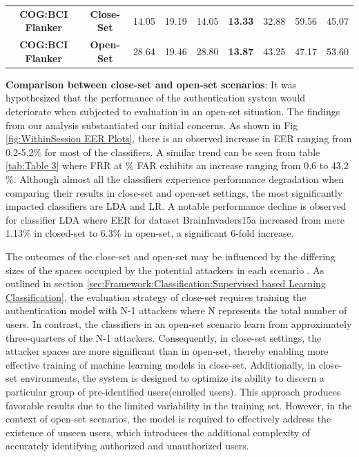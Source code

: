 \begin{table}[ht]
{\begin{tabular}{cc|ccccccc}
\rule{0pt}{25pt} \textbf{COG:BCI Flanker} & \textbf{Close-Set} & 14.05 & 19.19 & 14.05 & \textbf{13.33} & 32.88 & 59.56 & 45.07\\
\rule{0pt}{25pt} \textbf{COG:BCI Flanker} & \textbf{Open-Set}& 28.64 & 19.46 & 28.80 & \textbf{13.87} & 43.25 & 47.17 & 53.60\\
\hline
\end{tabular}
}
\end{table}

\textbf{\large Comparison between close-set and open-set scenarios}: It was hypothesized that the performance of the authentication system would deteriorate when subjected to evaluation in an open-set situation. The findings from our analysis substantiated our initial concerns. As shown in Fig \ref{fig:WithinSession EER Plots}, there is an observed increase in EER ranging from 0.2-5.2$\%$ for most of the classifiers. A similar trend can be seen from table \ref{tab:Table 3} where FRR at $\%$ FAR exhibits an increase ranging from 0.6 to 43.2$\%$. Although almost all the classifiers experience performance degradation when comparing their results in close-set and open-set settings, the most significantly impacted classifiers are LDA and LR. A notable performance decline is observed for classifier LDA where EER for dataset BrainInvaders15a increased from mere 1.13$\%$ in closed-set to 6.3$\%$ in open-set, a significant 6-fold increase. 
\smallskip

The outcomes of the close-set and open-set may be influenced by the differing sizes of the spaces occupied by the potential attackers in each scenario \cite{arias2023performance}. As outlined in section \ref{sec:Framework:Classification:Supervised based Learning Classification}, the evaluation strategy of close-set requires training the authentication model with N-1 attackers where N represents the total number of users. In contrast, the classifiers in an open-set scenario learn from approximately three-quarters of the N-1 attackers. Consequently, in close-set settings, the attacker spaces are more significant than in open-set, thereby enabling more effective training of machine learning models in close-set. Additionally, in close-set environments, the system is designed to optimize its ability to discern a particular group of pre-identified users(enrolled users). This approach produces favorable results due to the limited variability in the training set. However, in the context of open-set scenarios, the model is required to effectively address the existence of unseen users, which introduces the additional complexity of accurately identifying authorized and unauthorized users. 
\smallskip

